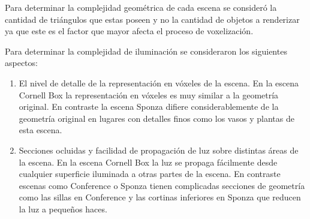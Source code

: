Para determinar la complejidad geométrica de cada escena se consideró la cantidad de triángulos que estas poseen y no la cantidad de objetos a renderizar ya que este es el factor que mayor afecta el proceso de voxelización.

Para determinar la complejidad de iluminación se consideraron los siguientes aspectos:

\begin{enumerate}
	\item El nivel de detalle de la representación en vóxeles de la escena. En la escena Cornell Box la representación en vóxeles es muy similar a la geometría original. En contraste la escena Sponza difiere considerablemente de la geometría original en lugares con detalles finos como los vasos y plantas de esta escena.
	\item Secciones ocluidas y facilidad de propagación de luz sobre distintas áreas de la escena. En la escena Cornell Box la luz se propaga fácilmente desde cualquier superficie iluminada a otras partes de la escena. En contraste escenas como Conference o Sponza tienen complicadas secciones de geometría como las sillas en Conference y las cortinas inferiores en Sponza que reducen la luz a pequeños haces.
\end{enumerate}
